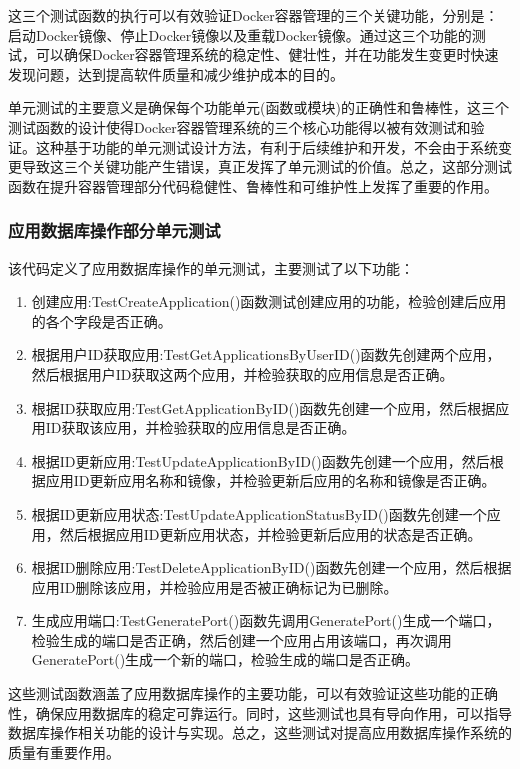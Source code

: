 \documentclass{HDU-Bachelor-Thesis}
\begin{document}
这三个测试函数的执行可以有效验证Docker容器管理的三个关键功能，分别是：启动Docker镜像、停止Docker镜像以及重载Docker镜像。通过这三个功能的测试，可以确保Docker容器管理系统的稳定性、健壮性，并在功能发生变更时快速发现问题，达到提高软件质量和减少维护成本的目的。

单元测试的主要意义是确保每个功能单元(函数或模块)的正确性和鲁棒性，这三个测试函数的设计使得Docker容器管理系统的三个核心功能得以被有效测试和验证。这种基于功能的单元测试设计方法，有利于后续维护和开发，不会由于系统变更导致这三个关键功能产生错误，真正发挥了单元测试的价值。总之，这部分测试函数在提升容器管理部分代码稳健性、鲁棒性和可维护性上发挥了重要的作用。

\subsubsection{应用数据库操作部分单元测试}

该代码定义了应用数据库操作的单元测试，主要测试了以下功能：

\begin{enumerate}   
    \item 创建应用:TestCreateApplication()函数测试创建应用的功能，检验创建后应用的各个字段是否正确。
    \item 根据用户ID获取应用:TestGetApplicationsByUserID()函数先创建两个应用，然后根据用户ID获取这两个应用，并检验获取的应用信息是否正确。
    \item 根据ID获取应用:TestGetApplicationByID()函数先创建一个应用，然后根据应用ID获取该应用，并检验获取的应用信息是否正确。
    \item 根据ID更新应用:TestUpdateApplicationByID()函数先创建一个应用，然后根据应用ID更新应用名称和镜像，并检验更新后应用的名称和镜像是否正确。 
    \item 根据ID更新应用状态:TestUpdateApplicationStatusByID()函数先创建一个应用，然后根据应用ID更新应用状态，并检验更新后应用的状态是否正确。
    \item 根据ID删除应用:TestDeleteApplicationByID()函数先创建一个应用，然后根据应用ID删除该应用，并检验应用是否被正确标记为已删除。
    \item 生成应用端口:TestGeneratePort()函数先调用GeneratePort()生成一个端口，检验生成的端口是否正确，然后创建一个应用占用该端口，再次调用GeneratePort()生成一个新的端口，检验生成的端口是否正确。
\end{enumerate}

这些测试函数涵盖了应用数据库操作的主要功能，可以有效验证这些功能的正确性，确保应用数据库的稳定可靠运行。同时，这些测试也具有导向作用，可以指导数据库操作相关功能的设计与实现。总之，这些测试对提高应用数据库操作系统的质量有重要作用。
\end{document}
